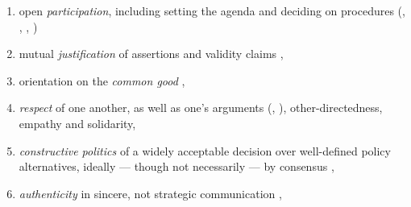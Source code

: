 \begin{enumerate}
	\item open \emph{participation}, including setting the agenda and deciding on procedures (\citealt{Benhabib-1996-aa}, \citealt{Chambers1995}, \citealt{Cohen-1989-aa}, \citealt[370ff]{Habermas1992})

	\item mutual \emph{justification} of assertions and validity claims \citep[370]{Habermas1992},

	\item orientation on the \emph{common good} \citep{Rawls-1971},

	\item \emph{respect} of one another, as well as one's arguments (\citealt{Gutmann1996}, \citealt{Macedo1999}), other-directedness, empathy and solidarity,

	\item \emph{constructive politics} of a widely acceptable decision over well-defined policy alternatives, ideally --- though not necessarily --- by consensus \citep[23]{Cohen-1989-aa},

	\item \emph{authenticity} in sincere, not strategic communication \citep[149]{Habermas-1984},
\end{enumerate}

